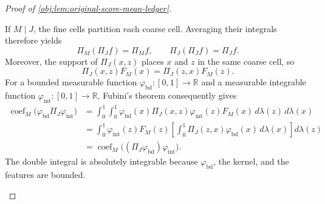 \documentclass[11pt]{article}
\begin{document}
\begin{proof}[Proof of \cref{obj:lem:original-score-mean-ledger}]
\begin{enumerate}
If \(M\mid J\), the fine cells partition each coarse cell. Averaging their integrals therefore yields
\[
\Pi_M(\Pi_Jf)=\Pi_Mf,
\qquad
\Pi_J(\Pi_Jf)=\Pi_Jf.
\]
Moreover, the support of \(\Pi_J(x,z)\) places \(x\) and \(z\) in the same coarse cell, so
\[
\Pi_J(x,z)F_M(x)=\Pi_J(z,x)F_M(z).
\]
For a bounded measurable function \(\varphi_{\mathrm{bd}}:[0,1]\to\mathbb R\) and a measurable integrable function \(\varphi_{\mathrm{int}}:[0,1]\to\mathbb R\), Fubini's theorem consequently gives
\[
\begin{aligned}
\operatorname{coef}_M\bigl(\varphi_{\mathrm{bd}}\Pi_J\varphi_{\mathrm{int}}\bigr)
&=\int_0^1\int_0^1
\varphi_{\mathrm{bd}}(x)\Pi_J(x,z)\varphi_{\mathrm{int}}(z)F_M(x)\,d\lambda(z)\,d\lambda(x)\\
&=\int_0^1 \varphi_{\mathrm{int}}(z)F_M(z)
\left[\int_0^1\Pi_J(z,x)\varphi_{\mathrm{bd}}(x)\,d\lambda(x)\right]d\lambda(z)\\
&=\operatorname{coef}_M\bigl((\Pi_J\varphi_{\mathrm{bd}})\varphi_{\mathrm{int}}\bigr).
\end{aligned}
\]
The double integral is absolutely integrable because \(\varphi_{\mathrm{bd}}\), the kernel, and the features are bounded.


\end{enumerate}
\end{proof}
\end{document}
